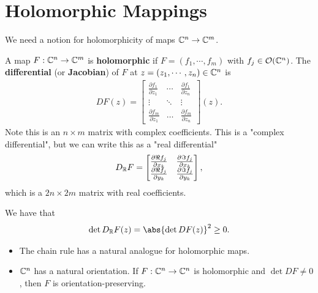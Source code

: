 
\section{Holomorphic Mappings}

We need a notion for holomorphicity of maps $\mathbb{C}^n \to \mathbb{C}^m$.



\begin{definition}
    A map $F : \mathbb{C}^n \to \mathbb{C}^m$ is \textbf{holomorphic} if $F = (f_1 , \cdots, f_m)$ with $f_j \in \mathcal{O}(\mathbb{C}^n)$. The \textbf{differential} (or \textbf{Jacobian}) of $F$ at $z = (z_1, \cdots, z_n) \in \mathbb{C}^n$ is
    \begin{align*}
        D F(z) =
        \begin{bmatrix}
            \frac{\partial f_1}{\partial z_1} & \cdots & \frac{\partial f_1}{\partial z_n}\\
            \vdots & \ddots & \vdots\\
            \frac{\partial f_m}{\partial z_1} & \hdots & \frac{\partial f_m}{\partial z_n}
        \end{bmatrix} (z).
    \end{align*}
    Note this is an $n \times m$ matrix with complex coefficients. This is a "complex differential", but we can write this as a "real differential"
    \begin{align*}
        D_{\mathbb{R}} F = \begin{bmatrix}
            \frac{\partial \Re f_j}{\partial x_k} & \frac{\partial \Im f_j}{\partial x_k}\\
            \frac{\partial \Re f_j}{\partial y_k} & \frac{\partial \Im f_j}{\partial y_k}
        \end{bmatrix} ,
    \end{align*}
    which is a $2n \times 2m$ matrix with real coefficients.
\end{definition}

\begin{lemma}
    We have that
    \begin{align*}
        \det D_\R F(z) = \abs{ \det D F(z) }^2 \geq 0.
    \end{align*}
\end{lemma}


\begin{remark} \hphantom{.}
    \begin{itemize}
        \item The chain rule has a natural analogue for holomorphic maps.
        \item $\mathbb{C}^n$ has a natural orientation. If $F : \mathbb{C}^n \to \mathbb{C}^n$ is holomorphic and $\det DF \neq 0$, then $F$ is orientation-preserving.
    \end{itemize}
\end{remark}


